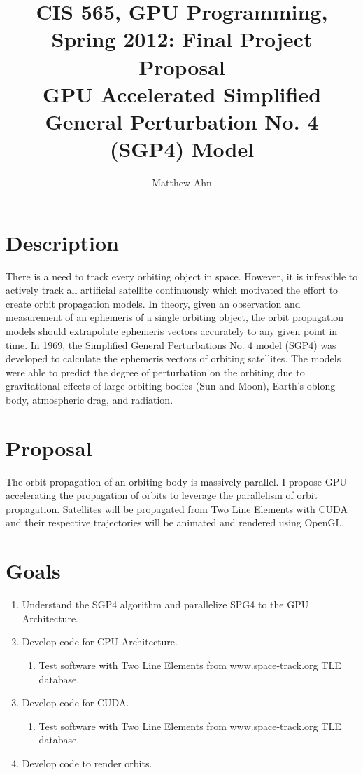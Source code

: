 \documentclass[english]{article}
\title{CIS 565, GPU Programming, Spring 2012: Final Project Proposal \\ GPU Accelerated Simplified General Perturbation No. 4 (SGP4) Model}
\author{Matthew Ahn}
\begin{document}
\maketitle
\section*{Description}
There is a need to track every orbiting object in space. However, it is infeasible to actively track all artificial satellite continuously which motivated the effort to create orbit propagation models. In theory, given an observation and measurement of an ephemeris of a single orbiting object, the orbit propagation models should extrapolate ephemeris vectors accurately to any given point in time. In 1969, the Simplified General Perturbations No. 4 model (SGP4) was developed to calculate the ephemeris vectors of orbiting satellites. The models were able to predict the degree of perturbation on the orbiting due to gravitational effects of large orbiting bodies (Sun and Moon), Earth's oblong body, atmospheric drag, and radiation. \cite{SGP4}

\section*{Proposal}
The orbit propagation of an orbiting body is massively parallel. I propose GPU accelerating the propagation of orbits to leverage the parallelism of orbit propagation. Satellites will be propagated from Two Line Elements with CUDA and their respective trajectories will be animated and rendered using OpenGL.

\section*{Goals}
\begin{enumerate}
\item Understand the SGP4 algorithm and parallelize SPG4 to the GPU Architecture.
\item Develop code for CPU Architecture.
\begin{enumerate}
\item Test software with Two Line Elements from www.space-track.org TLE database.
\end{enumerate}
\item Develop code for CUDA.
\begin{enumerate}
\item Test software with Two Line Elements from www.space-track.org TLE database.
\end{enumerate}
\item Develop code to render orbits.

\end{enumerate}




    
    
\end{document}
